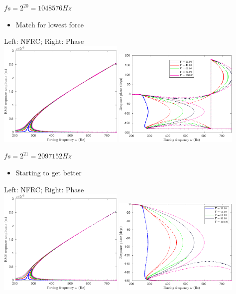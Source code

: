 \documentclass[9pt]{beamer}
\begin{document}
\begin{frame}{$fs=2^{20}=1048576 Hz$}
  \begin{itemize}
  \item Match for lowest force
  \end{itemize}
  \begin{center}
    Left: NFRC; Right: Phase\\
    \includegraphics[width=0.45\textwidth]{fig/nfrc/dssex_frf_Amp_fs1048576}
    \includegraphics[width=0.45\textwidth]{fig/nfrc/dssex_frf_Phase_fs1048576}
  \end{center}
\end{frame}


\begin{frame}{$fs=2^{21}=2097152 Hz$}
  \begin{itemize}
  \item Starting to get better
  \end{itemize}
  \begin{center}
    Left: NFRC; Right: Phase\\
    \includegraphics[width=0.45\textwidth]{fig/nfrc/dssex_frf_Amp_fs2097152}
    \includegraphics[width=0.45\textwidth]{fig/nfrc/dssex_frf_Phase_fs2097152}
  \end{center}
\end{frame}
\end{document}
